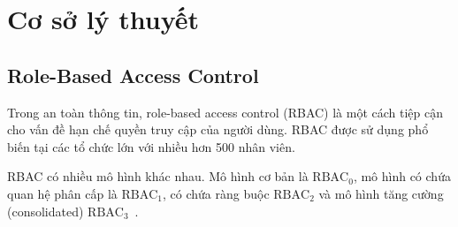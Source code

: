 

\section{Cơ sở lý thuyết}
\subsection{Role-Based Access Control}
Trong an toàn thông tin, role-based access control (RBAC) là
một cách tiệp cận cho vấn đề hạn chế quyền truy cập của
người dùng. RBAC được sử dụng phổ biến tại các tổ chức
lớn với nhiều hơn 500 nhân viên. 

RBAC có nhiều mô hình khác nhau. Mô hình cơ bản là
$\text{RBAC}_0$, mô hình có chứa quan hệ phân cấp là
$\text{RBAC}_1$, có chứa ràng buộc $\text{RBAC}_2$ và mô hình tăng
cường (consolidated) $\text{RBAC}_3$~\cite{rbac}.

